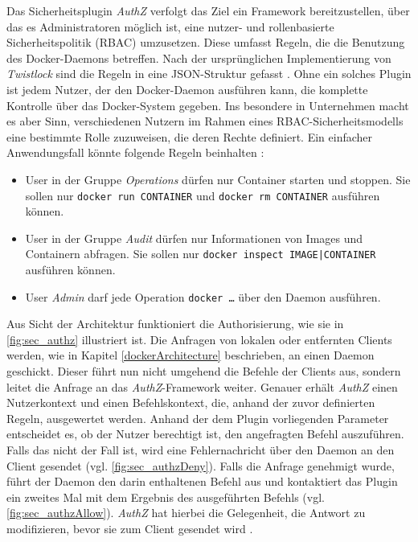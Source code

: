 \documentclass[../main.tex]{subfiles}
\begin{document}
    Das Sicherheitsplugin \emph{AuthZ} verfolgt das Ziel ein Framework bereitzustellen, über das es Administratoren möglich ist, eine nutzer- und rollenbasierte Sicherheitspolitik (\acrshort{RBAC}) umzusetzen. Diese umfasst Regeln, die die Benutzung des Docker-Daemons betreffen. Nach der ursprünglichen Implementierung von \emph{Twistlock} sind die Regeln in eine JSON-Struktur gefasst \cite{githubAuthZJSON}. Ohne ein solches Plugin ist jedem Nutzer, der den Docker-Daemon ausführen kann, die komplette Kontrolle über das Docker-System gegeben. Ins besondere in Unternehmen macht es aber Sinn, verschiedenen Nutzern im Rahmen eines RBAC-Sicherheitsmodells eine bestimmte Rolle zuzuweisen, die deren Rechte definiert. Ein einfacher Anwendungsfall könnte folgende Regeln beinhalten \cite{authzTwistlock}:

    \begin{itemize}
        \item User in der Gruppe \emph{Operations} dürfen nur Container starten und stoppen. Sie sollen nur \texttt{docker run CONTAINER} und \texttt{docker rm CONTAINER} ausführen können.
        \item User in der Gruppe \emph{Audit} dürfen nur Informationen von Images und Containern abfragen. Sie sollen nur \texttt{docker inspect IMAGE|CONTAINER} ausführen können.
        \item User \emph{Admin} darf jede Operation \texttt{docker \dots} über den Daemon ausführen.
    \end{itemize}

    Aus Sicht der Architektur funktioniert die Authorisierung, wie sie in \fig \ref{fig:sec_authz} illustriert ist. Die Anfragen von lokalen oder entfernten Clients werden, wie in Kapitel \ref{dockerArchitecture} beschrieben, an einen Daemon geschickt. Dieser führt nun nicht umgehend die Befehle der Clients aus, sondern leitet die Anfrage an das \emph{AuthZ}-Framework weiter. Genauer erhält \emph{AuthZ} einen Nutzerkontext und einen Befehlskontext, die, anhand der zuvor definierten Regeln, ausgewertet werden. Anhand der dem Plugin vorliegenden Parameter entscheidet es, ob der Nutzer berechtigt ist, den angefragten Befehl auszuführen. Falls das nicht der Fall ist, wird eine Fehlernachricht über den Daemon an den Client gesendet (vgl. \fig \ref{fig:sec_authzDeny}). Falls die Anfrage genehmigt wurde, führt der Daemon den darin enthaltenen Befehl aus und kontaktiert das Plugin ein zweites Mal mit dem Ergebnis des ausgeführten Befehls (vgl. \fig \ref{fig:sec_authzAllow}). \emph{AuthZ} hat hierbei die Gelegenheit, die Antwort zu modifizieren, bevor sie zum Client gesendet wird \cite{authzTwistlock}\cite{githubAuthZDraft}.
\end{document}
